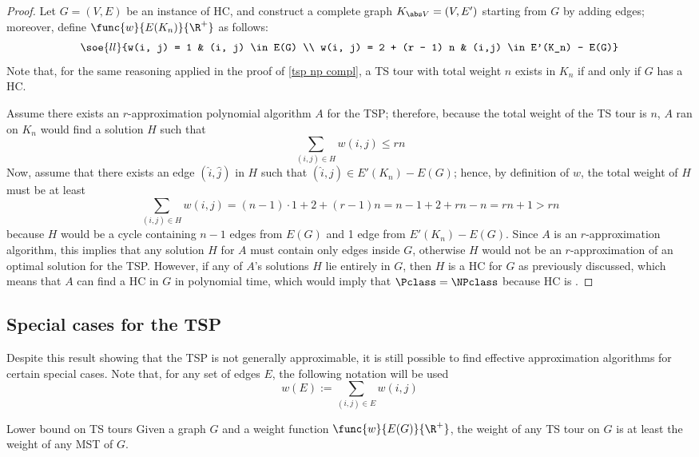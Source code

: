 \documentclass[a4paper, 12pt]{report}
\begin{document}
    \begin{proof}
        Let $G = (V, E)$ be an instance of HC, and construct a complete graph $K_{\abs V} = (V, E')$ starting from $G$ by adding edges; moreover, define $\func{w}{E(K_n)}{\R^+}$ as follows: $$\soe{ll}{w(i, j) = 1 & (i, j) \in E(G) \\ w(i, j) = 2 + (r - 1) n & (i,j) \in E'(K_n) - E(G)}$$ Note that, for the same reasoning applied in the proof of \cref{tsp np compl}, a TS tour with total weight $n$ exists in $K_n$ if and only if $G$ has a HC.

        Assume there exists an $r$-approximation polynomial algorithm $A$ for the TSP; therefore, because the total weight of the TS tour is $n$, $A$ ran on $K_n$ would find a solution $H$ such that $$\sum_{(i, j) \in H} {w(i, j)} \le rn$$ Now, assume that there exists an edge $(\hat i, \hat j)$ in $H$ such that $(\hat i, \hat j) \in E'(K_n) - E(G)$; hence, by definition of $w$, the total weight of $H$ must be at least $$\sum_{(i, j) \in H}{w(i, j)} = (n - 1) \cdot 1  + 2 + (r - 1)n = n - 1 + 2 + rn - n = rn + 1 > rn$$ because $H$ would be a cycle containing $n - 1$ edges from $E(G)$ and 1 edge from $E'(K_n) - E(G)$. Since $A$ is an $r$-approximation algorithm, this implies that any solution $H$ for $A$ must contain only edges inside $G$, otherwise $H$ would not be an $r$-approximation of an optimal solution for the TSP. However, if any of $A$'s solutions $H$ lie entirely in $G$, then $H$ is a HC for $G$ as previously discussed, which means that $A$ can find a HC in $G$ in polynomial time, which would imply that $\Pclass = \NPclass$ because HC is \NPComplete.
    \end{proof}

    \subsection{Special cases for the TSP}

    Despite this result showing that the TSP is not generally approximable, it is still possible to find effective approximation algorithms for certain special cases. Note that, for any set of edges $E$, the following notation will be used $$w(E) := \sum_{(i, j) \in E}{w(i,j)}$$
    
    \begin{framedlem}[label={tsp bound}]{Lower bound on TS tours}
        Given a graph $G$ and a weight function $\func{w}{E(G)}{\R^+}$, the weight of any TS tour on $G$ is at least the weight of any MST of $G$.
    \end{framedlem}
\end{document}
